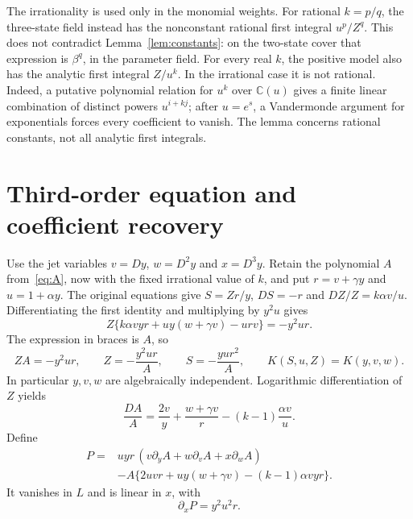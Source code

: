 \documentclass[10pt,a4paper]{article}
\theoremstyle{definition}\newtheorem{definition}[theorem]{Definition}
\newcommand{\C}{\mathbb C}
\begin{document}
The irrationality is used only in the monomial weights. For rational
$k=p/q$, the three-state field instead has the nonconstant rational
first integral $u^p/Z^q$. This does not contradict
Lemma~\ref{lem:constants}: on the two-state cover that expression is
$\beta^q$, in the parameter field. For every real $k$, the positive
model also has the analytic first integral $Z/u^k$. In the irrational
case it is not rational. Indeed, a putative polynomial relation for
$u^k$ over $\C(u)$ gives a finite linear combination of distinct powers
$u^{i+kj}$; after $u=e^s$, a Vandermonde argument for exponentials
forces every coefficient to vanish. The lemma concerns rational
constants, not all analytic first integrals.

\section{Third-order equation and coefficient recovery}
\label{sec:irrIO}
Use the jet variables $v=Dy$, $w=D^2y$ and $x=D^3y$.
Retain the polynomial $A$ from~\eqref{eq:A}, now with the
fixed irrational value of $k$, and put $r=v+\gamma y$ and $u=1+\alpha y$.
The original equations give $S=Zr/y$, $DS=-r$ and $DZ/Z=k\alpha v/u$.
Differentiating the first identity and multiplying by $y^2u$ gives
\[
Z\{k\alpha vyr+uy(w+\gamma v)-urv\}=-y^2ur.
\]
The expression in braces is $A$, so
\begin{equation}
ZA=-y^2ur,\qquad Z=-\frac{y^2ur}{A},\qquad
S=-\frac{yur^2}{A},\qquad K(S,u,Z)=K(y,v,w).
\label{eq:irrrecover}
\end{equation}
In particular $y,v,w$ are algebraically independent. Logarithmic
differentiation of $Z$ yields
\[
\frac{DA}{A}=\frac{2v}{y}+\frac{w+\gamma v}{r}
 -(k-1)\frac{\alpha v}{u}.
\]
Define
\begin{equation}
\begin{split}
P={}&uyr\,(v\partial_yA+w\partial_vA+x\partial_wA)\\
 &-A\{2uvr+uy(w+\gamma v)-(k-1)\alpha vyr\}.
\end{split}
\label{eq:irrP}
\end{equation}
It vanishes in $L$ and is linear in $x$, with
\begin{equation}
\partial_xP=y^2u^2r.
\label{eq:irrinitial}
\end{equation}
\end{document}
